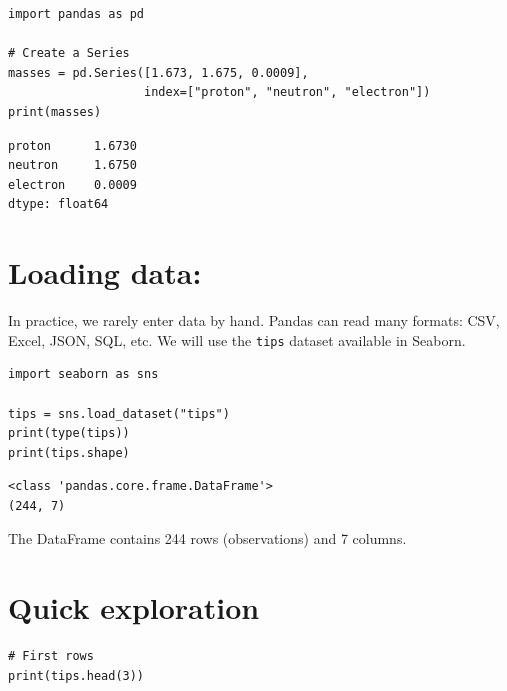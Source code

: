 \begin{codeblock}[title=\textbf{Python}]
\begin{verbatim}
import pandas as pd

# Create a Series
masses = pd.Series([1.673, 1.675, 0.0009],
                   index=["proton", "neutron", "electron"])
print(masses)
\end{verbatim}
\end{codeblock}

\begin{codeoutput}
\begin{verbatim}
proton      1.6730
neutron     1.6750
electron    0.0009
dtype: float64
\end{verbatim}
\end{codeoutput}

\section{Loading data: }

In practice, we rarely enter data by hand. Pandas can read many
formats: CSV, Excel, JSON, SQL, etc. We will use the
\texttt{tips} dataset available in Seaborn.

\begin{codeblock}[title=\textbf{Python}]
\begin{verbatim}
import seaborn as sns

tips = sns.load_dataset("tips")
print(type(tips))
print(tips.shape)
\end{verbatim}
\end{codeblock}

\begin{codeoutput}
\begin{verbatim}
<class 'pandas.core.frame.DataFrame'>
(244, 7)
\end{verbatim}
\end{codeoutput}

The DataFrame  contains 244 rows (observations) and 7 columns.

\section{Quick exploration}

\begin{codeblock}[title=\textbf{Python}]
\begin{verbatim}
# First rows
print(tips.head(3))
\end{verbatim}
\end{codeblock}

